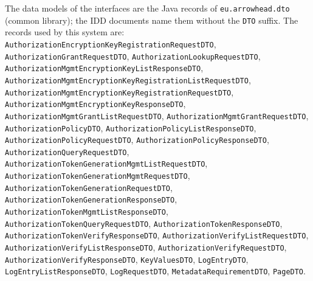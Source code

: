 \documentclass[a4paper]{arrowhead}
\begin{document}
The data models of the interfaces are the Java records of \texttt{eu.arrowhead.dto} (common library); the IDD documents name them without the \texttt{DTO} suffix. The records used by this system are: \texttt{Authorization\allowbreak{}Encryption\allowbreak{}Key\allowbreak{}Registration\allowbreak{}Request\allowbreak{}DTO}, \texttt{Authorization\allowbreak{}Grant\allowbreak{}Request\allowbreak{}DTO}, \texttt{Authorization\allowbreak{}Lookup\allowbreak{}Request\allowbreak{}DTO}, \texttt{Authorization\allowbreak{}Mgmt\allowbreak{}Encryption\allowbreak{}Key\allowbreak{}List\allowbreak{}Response\allowbreak{}DTO}, \texttt{Authorization\allowbreak{}Mgmt\allowbreak{}Encryption\allowbreak{}Key\allowbreak{}Registration\allowbreak{}List\allowbreak{}Request\allowbreak{}DTO}, \texttt{Authorization\allowbreak{}Mgmt\allowbreak{}Encryption\allowbreak{}Key\allowbreak{}Registration\allowbreak{}Request\allowbreak{}DTO}, \texttt{Authorization\allowbreak{}Mgmt\allowbreak{}Encryption\allowbreak{}Key\allowbreak{}Response\allowbreak{}DTO}, \texttt{Authorization\allowbreak{}Mgmt\allowbreak{}Grant\allowbreak{}List\allowbreak{}Request\allowbreak{}DTO}, \texttt{Authorization\allowbreak{}Mgmt\allowbreak{}Grant\allowbreak{}Request\allowbreak{}DTO}, \texttt{Authorization\allowbreak{}Policy\allowbreak{}DTO}, \texttt{Authorization\allowbreak{}Policy\allowbreak{}List\allowbreak{}Response\allowbreak{}DTO}, \texttt{Authorization\allowbreak{}Policy\allowbreak{}Request\allowbreak{}DTO}, \texttt{Authorization\allowbreak{}Policy\allowbreak{}Response\allowbreak{}DTO}, \texttt{Authorization\allowbreak{}Query\allowbreak{}Request\allowbreak{}DTO}, \texttt{Authorization\allowbreak{}Token\allowbreak{}Generation\allowbreak{}Mgmt\allowbreak{}List\allowbreak{}Request\allowbreak{}DTO}, \texttt{Authorization\allowbreak{}Token\allowbreak{}Generation\allowbreak{}Mgmt\allowbreak{}Request\allowbreak{}DTO}, \texttt{Authorization\allowbreak{}Token\allowbreak{}Generation\allowbreak{}Request\allowbreak{}DTO}, \texttt{Authorization\allowbreak{}Token\allowbreak{}Generation\allowbreak{}Response\allowbreak{}DTO}, \texttt{Authorization\allowbreak{}Token\allowbreak{}Mgmt\allowbreak{}List\allowbreak{}Response\allowbreak{}DTO}, \texttt{Authorization\allowbreak{}Token\allowbreak{}Query\allowbreak{}Request\allowbreak{}DTO}, \texttt{Authorization\allowbreak{}Token\allowbreak{}Response\allowbreak{}DTO}, \texttt{Authorization\allowbreak{}Token\allowbreak{}Verify\allowbreak{}Response\allowbreak{}DTO}, \texttt{Authorization\allowbreak{}Verify\allowbreak{}List\allowbreak{}Request\allowbreak{}DTO}, \texttt{Authorization\allowbreak{}Verify\allowbreak{}List\allowbreak{}Response\allowbreak{}DTO}, \texttt{Authorization\allowbreak{}Verify\allowbreak{}Request\allowbreak{}DTO}, \texttt{Authorization\allowbreak{}Verify\allowbreak{}Response\allowbreak{}DTO}, \texttt{KeyValuesDTO}, \texttt{LogEntryDTO}, \texttt{Log\allowbreak{}Entry\allowbreak{}List\allowbreak{}Response\allowbreak{}DTO}, \texttt{LogRequestDTO}, \texttt{Metadata\allowbreak{}Requirement\allowbreak{}DTO}, \texttt{PageDTO}.
\end{document}
